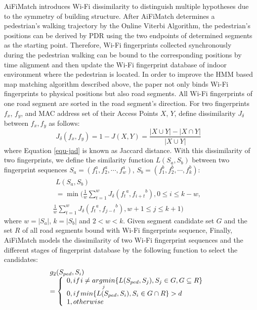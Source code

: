 \documentclass[conference]{IEEEtran}
\begin{document}
AiFiMatch introduces Wi-Fi dissimilarity to distinguish multiple hypotheses due to the symmetry of building structure. After AiFiMatch determines a pedestrian's walking trajectory by the Online Viterbi Algorithm, the pedestrian's positions can be derived by PDR using the two endpoints of determined segments as the starting point. Therefore, Wi-Fi fingerprints collected synchronously during the pedestrian walking can be bound to the corresponding positions by time alignment and then update the Wi-Fi fingerprint database of indoor environment where the pedestrian is located. In order to improve the HMM based map matching algorithm described above, the paper not only binds Wi-Fi fingerprints to physical positions but also road segments. All Wi-Fi fingerprints of one road segment are sorted in the road segment's direction. For two fingerprints $f_x$, $f_y$, and MAC address set of their Access Points $X$, $Y$, define dissimilarity $J_{\delta}$ between $f_x,f_y$ as follows:
\begin{equation}
{J_\delta }(f_x,f_y) = 1 - J(X,Y) = \frac{{|X \cup Y| - |X \cap Y|}}{{|X \cup Y|}}
\label{equ-jad}
\end{equation}
where Equation \ref{equ-jad} is known as Jaccard distance. With this dissimilarity of two fingerprints, we define the similarity function $L(S_a, S_b)$ between two fingerprint sequences $S_a = (f_1^a,f_2^a,\cdots,f_w^a)$, $S_b = (f_1^b, f_2^b, \cdots, f_k^b)$:
\begin{equation}
\begin{array}{*{20}{c}}
\begin{array}{l}
L({S_a},{S_b})\\
= \min (\frac{1}{w}\sum\limits_{t = 1}^w {{J_\delta }({f_t}^a,{f_{i + t}}^b),0 \le i \le k - w,} 
\end{array}\\
{\frac{1}{w}\sum\limits_{t = 1}^w {{J_\delta }({f_t}^a,{f_{j - t}}^b),w + 1 \le j \le k + 1} )}
\end{array}
\end{equation}
where $w=|S_a|$, $k=|S_b|$ and $2<w<k$. Given segment candidate set $G$ and the set $R$ of all road segments bound with Wi-Fi fingerprints sequence, Finally, AiFiMatch models the dissimilarity of two Wi-Fi fingerprint sequences and the different stages of fingerprint database by the following function to select the candidates: 
\begin{equation}
\begin{array}{l}
{g_2}({S_{ped}},{S_i})\\
= \left\{ {\begin{array}{*{20}{l}}
	{0,if{\kern 1pt} i \ne \mathop {argmin}\limits_j \{ L({S_{ped}},{S_j}),{S_j} \in G,G \subseteq R\} }\\
	{0,if{\kern 1pt} min\{ L({S_{ped}},{S_i}),{S_i} \in G \cap R\}  > d}\\
	{1,otherwise}
	\end{array}} \right.
\end{array}
\end{equation}
\end{document}
